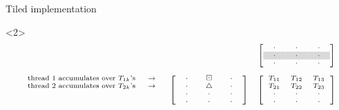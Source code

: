 \documentclass[14pt]{beamer}
\begin{document}
\begin{frame}{Tiled implementation}
\begin{onlyenv}
\begin{onlyenv}<2>
\[
\scriptsize
\begin{array}{ccc}
&& \left[\begin{array}{ccc}
\ \ \cdot \ \ & \ \ \cdot \ \  & \ \ \cdot \ \ \\
\ \ \cl{\cdot} \ \ & \ \ \cl{\cdot} \ \  & \ \ \cl{\cdot} \ \ \\
\ \ \cdot \ \ & \ \ \cdot \ \  & \ \ \cdot \ \ \\
\end{array}\right]\\
\\
\begin{array}{r}
\text{thread 1 accumulates over $T_{1k}$'s} \ \ \ \ \rw\\
\text{thread 2 accumulates over $T_{2k}$'s} \ \ \ \ \rw\\
\\
\\
\end{array}
& \left[\begin{array}{ccc}
\ \ \cdot \ \  & \bd & \ \ \cdot \ \  \\
\ \ \cdot \ \  & \uptri & \ \ \cdot \ \  \\
\ \ \cdot \ \ & \ \ \cdot \ \  & \ \ \cdot \ \ \\
\ \ \cdot \ \ & \ \ \cdot \ \  & \ \ \cdot \ \ \\
\end{array}\right]
& \left[\begin{array}{ccc}
T_{11} & T_{12} & T_{13} \\
T_{21} & T_{22} & T_{23} \\
\ \ \cdot \ \ & \ \ \cdot \ \  & \ \ \cdot \ \ \\
\ \ \cdot \ \ & \ \ \cdot \ \  & \ \ \cdot \ \ \\
\end{array}\right]
\end{array}
\]
\end{onlyenv}


\end{onlyenv}
\end{frame}
\end{document}
